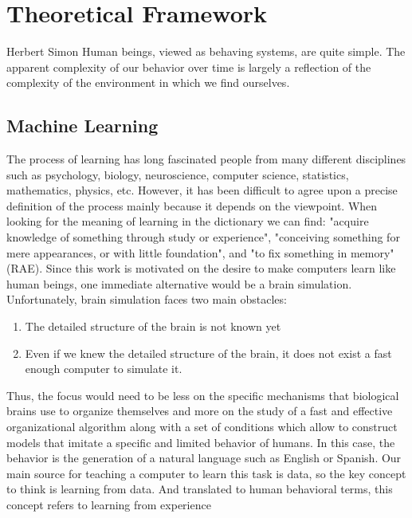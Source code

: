 \chapter{Theoretical Framework}
\label{ch:teo}

\begin{chapterquote}{Herbert Simon}
Human beings, viewed as behaving systems, are quite simple.
The apparent complexity of our behavior over time is largely a
reflection of the complexity of the environment in which we find
ourselves.
\end{chapterquote}


\section{Machine Learning}

The process of learning has long fascinated people from many different disciplines such as psychology, biology, neuroscience, computer science, statistics, mathematics, physics, etc. However, it has been difficult to agree upon a precise definition of the process mainly because it depends on the viewpoint. When looking for the meaning of learning in the dictionary we can find: "acquire knowledge of something through study or experience", "conceiving something for mere appearances, or with little foundation", and "to fix something in memory"(RAE). Since this work is motivated on the desire to make computers learn like human beings, one immediate alternative would be a brain simulation. Unfortunately, brain simulation faces two main obstacles\cite{natarajan2014machine}:
\begin{enumerate}
\item  The detailed structure of the brain is not known yet
\item Even if we knew the detailed structure of the brain, it does not exist a fast enough computer to simulate it. 
\end{enumerate}

Thus, the focus would need to be less on the specific mechanisms that biological brains use to organize themselves and more on the study of a fast and effective organizational algorithm along with a set of conditions which allow to construct models that imitate a specific and limited behavior of humans\cite{strom2007hebbian}. In this case, the behavior is the generation of a natural language such as English or Spanish. Our main source for teaching a computer to learn this task is data, so the key concept to think is learning from data. And translated to human behavioral terms, this concept refers to learning from experience

